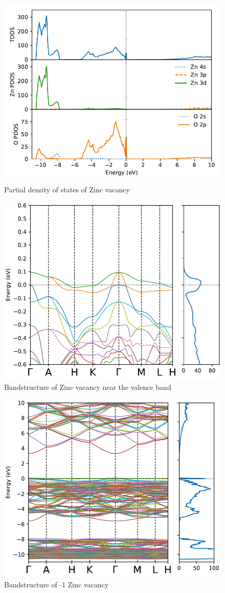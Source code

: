 \begin{figure}[tbh!]
	\centering
	\includegraphics[width=0.6\linewidth]{"images/rnd/dos-pdos_Zn_vac"}
	\caption[Partial density of states of Zinc vacancy]{Partial density of states of Zinc vacancy}
\end{figure}

\begin{figure}[tbh!]
	\centering
	\includegraphics[width=0.6\linewidth]{"images/rnd/band-dos-close_Zn_vac"}
	\caption[Bandstructure of Zinc vacancy near the valence band]{Bandstructure of Zinc vacancy near the valence band}
\end{figure}

\begin{figure}[tbh!]
	\centering
	\includegraphics[width=0.6\linewidth]{"images/rnd/band-dos_Zn_vac-n1"}
	\caption[Bandstructure of -1 Zinc vacancy]{Bandstructure of -1 Zinc vacancy}
\end{figure}

